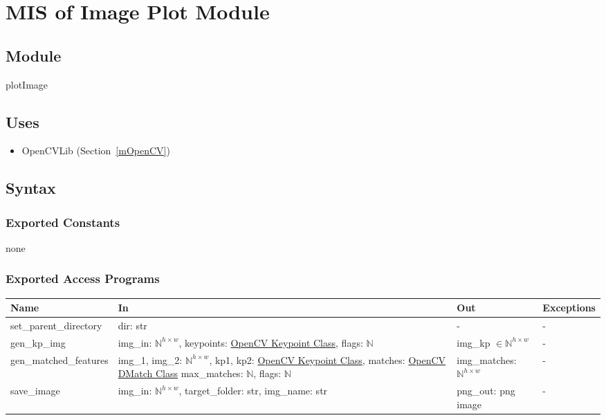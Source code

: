 \documentclass[12pt, titlepage]{article}
\begin{document}
\section{MIS of Image Plot Module} \label{mIP}
\subsection{Module}
plotImage

\subsection{Uses}
\begin{itemize}
  \item OpenCVLib (Section~\ref{mOpenCV})
\end{itemize}

\subsection{Syntax}
\subsubsection{Exported Constants}
none 

\subsubsection{Exported Access Programs}
\begin{center}
\begin{tabular}{p{4cm} p{5cm} p{4cm} p{2cm}}
\hline
\textbf{Name} & \textbf{In} & \textbf{Out} & \textbf{Exceptions} \\
\hline
set\_parent\_directory
& dir: str
& -
& - \\
\hline
gen\_kp\_img 
& img\_in: $\mathbb{N}^{h \times w}$, \newline
keypoints: \href{https://docs.opencv.org/3.4/d2/d29/classcv_1_1KeyPoint.html}{OpenCV Keypoint Class}, \newline
flags: $\mathbb{N}$ & img\_kp $\in \mathbb{N}^{h \times w}$ & - \\
\hline
gen\_matched\_features 
& img\_1, img\_2: $\mathbb{N}^{h \times w}$, \newline
kp1, kp2: \href{https://docs.opencv.org/3.4/d2/d29/classcv_1_1KeyPoint.html}{OpenCV Keypoint Class}, \newline
matches: \href{https://docs.opencv.org/3.4/d4/de0/classcv_1_1DMatch.html}{OpenCV DMatch Class} \newline
max\_matches: $\mathbb{N}$, \newline
flags: $\mathbb{N}$
& img\_matches: $\mathbb{N}^{h \times w}$ & - \\
\hline
save\_image
& img\_in: $\mathbb{N}^{h \times w}$, \newline
target\_folder: str, \newline
img\_name: str
& png\_out: png image
& - \\
\hline
\end{tabular}
\end{center}
\end{document}

